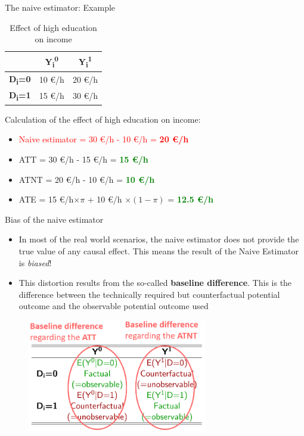 \documentclass{beamer}\usepackage[]{graphicx}\usepackage[]{color}
\begin{document}
\begin{frame}{The naive estimator: Example}
\begin{table}[]
\caption{Effect of high education on income}
\begin{tabular}{ccc}
\hline
\textbf{}                     & \textbf{Y\textsubscript{i}\textsuperscript{0}} & \textbf{Y\textsubscript{i}\textsuperscript{1}} \\ \hline
\textbf{D\textsubscript{i}=0} & {\color[HTML]{000000} 10 \euro/h}                  & {\color[HTML]{000000} 20 \euro/h}                   \\
\textbf{D\textsubscript{i}=1} & {\color[HTML]{000000} 15 \euro/h}                  & {\color[HTML]{000000} 30 \euro/h}                  \\ \hline
\end{tabular}
\end{table}
Calculation of the effect of high education on income:\\
\begin{itemize}
  \item \textcolor{red}{Naive estimator = 30 \euro/h - 10 \euro/h = \textbf{20 \euro/h}}
  \item ATT = 30 \euro/h - 15 \euro/h = \textcolor{green}{\textbf{15 \euro/h}}
  \item ATNT = 20 \euro/h - 10 \euro/h = \textcolor{green}{\textbf{10 \euro/h}}
  \item ATE = 15 \euro/h$\times \pi$ + 10 \euro/h $\times (1-\pi)$ = \textcolor{green}{\textbf{12.5 \euro/h}}
\end{itemize}
\end{frame}


\begin{frame}{Bias of the naive estimator}
\begin{itemize}
  \item In most of the real world scenarios, the naive estimator does not provide the true value of any causal effect. This means the result of the Naive Estimator is \textit{biased}! 
  \item This distortion results from the so-called \textbf{baseline difference}. This is the difference between the technically required but counterfactual potential outcome and the observable potential outcome used
\end{itemize}
\begin{figure}
\centering
\includegraphics[width=0.7\textwidth]{Graphics/BaselineDifferences.png}
\end{figure}
\end{frame}
\end{document}
